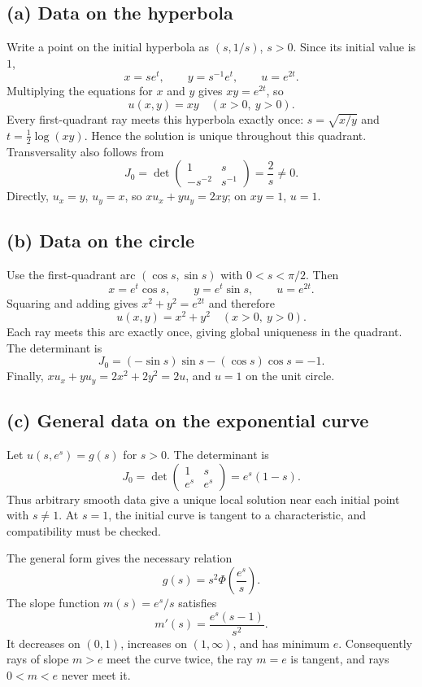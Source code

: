 \documentclass[11pt,a4paper]{article}
\newcommand{\answer}[1]{\begin{equation*}\boxed{\displaystyle #1}\end{equation*}}
\begin{document}
\subsection*{(a) Data on the hyperbola}
Write a point on the initial hyperbola as $(s,1/s)$, $s>0$. Since its initial value is $1$,
\[
 x=se^t,\qquad y=s^{-1}e^t,\qquad u=e^{2t}.
\]
Multiplying the equations for $x$ and $y$ gives $xy=e^{2t}$, so
\answer{u(x,y)=xy\quad(x>0,\ y>0).}
Every first-quadrant ray meets this hyperbola exactly once: $s=\sqrt{x/y}$ and $t=\frac12\log(xy)$. Hence the solution is unique throughout this quadrant. Transversality also follows from
\[
 J_0=\det\begin{pmatrix}1&s\\-s^{-2}&s^{-1}\end{pmatrix}=\frac2s\ne0.
\]
Directly, $u_x=y$, $u_y=x$, so $xu_x+yu_y=2xy$; on $xy=1$, $u=1$.

\subsection*{(b) Data on the circle}
Use the first-quadrant arc $(\cos s,\sin s)$ with $0<s<\pi/2$. Then
\[
 x=e^t\cos s,\qquad y=e^t\sin s,\qquad u=e^{2t}.
\]
Squaring and adding gives $x^2+y^2=e^{2t}$ and therefore
\answer{u(x,y)=x^2+y^2\quad(x>0,\ y>0).}
Each ray meets this arc exactly once, giving global uniqueness in the quadrant. The determinant is
\[
 J_0=(-\sin s)\sin s-(\cos s)\cos s=-1.
\]
Finally, $xu_x+yu_y=2x^2+2y^2=2u$, and $u=1$ on the unit circle.

\subsection*{(c) General data on the exponential curve}
Let $u(s,e^s)=g(s)$ for $s>0$. The determinant is
\[
 J_0=\det\begin{pmatrix}1&s\\e^s&e^s\end{pmatrix}=e^s(1-s).
\]
Thus arbitrary smooth data give a unique local solution near each initial point with $s\ne1$. At $s=1$, the initial curve is tangent to a characteristic, and compatibility must be checked.

The general form gives the necessary relation
\[
 g(s)=s^2\Phi\!\left(\frac{e^s}{s}\right).
\]
The slope function $m(s)=e^s/s$ satisfies
\[
 m'(s)=\frac{e^s(s-1)}{s^2}.
\]
It decreases on $(0,1)$, increases on $(1,\infty)$, and has minimum $e$. Consequently rays of slope $m>e$ meet the curve twice, the ray $m=e$ is tangent, and rays $0<m<e$ never meet it.
\end{document}
